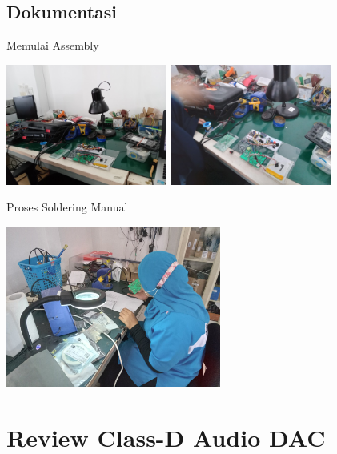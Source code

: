 \documentclass[table,dvipsnames]{beamer}
\begin{document}
	\begin{frame}
		\subsection{Dokumentasi}
		\begin{exampleblock}{Memulai Assembly}
			\begin{center}
				\includegraphics[width=150pt]{images/assembly_unpack}
				\includegraphics[width=150pt]{images/assembly_start}
			\end{center}
		\end{exampleblock}
	\end{frame}

	\begin{frame}
		\begin{exampleblock}{Proses Soldering Manual}
			\begin{center}
				\includegraphics[width=200pt]{images/assembly_manual}
			\end{center}
		\end{exampleblock}
	\end{frame}

	\section{Review Class-D Audio DAC}
\end{document}
